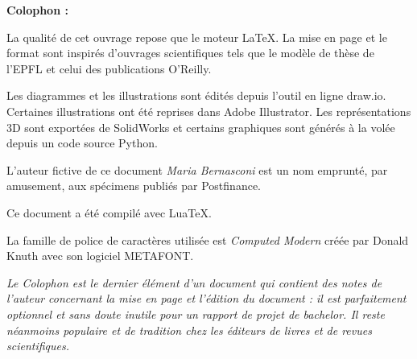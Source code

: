 \clearpage
\Large\textbf{Colophon :}\par\normalsize
\thispagestyle{empty}
La qualité de cet ouvrage repose que le moteur \LaTeX. La mise en page et le format sont inspirés d'ouvrages scientifiques tels que le modèle de thèse de l'EPFL et celui des publications O'Reilly.

Les diagrammes et les illustrations sont édités depuis l'outil en ligne draw.io. Certaines illustrations ont été reprises dans Adobe Illustrator. Les représentations 3D sont exportées de SolidWorks et certains graphiques sont générés à la volée depuis un code source Python.

L'auteur fictive de ce document \emph{Maria Bernasconi} est un nom emprunté, par amusement, aux spécimens publiés par Postfinance.

Ce document a été compilé avec \mbox{Lua\TeX}.

La famille de police de caractères utilisée est \emph{Computed Modern} créée par Donald Knuth avec son logiciel METAFONT.

\vfil

\emph{Le Colophon est le dernier élément d'un document qui contient des notes de l'auteur concernant la mise en page et l'édition du document : il est parfaitement optionnel et sans doute inutile pour un rapport de projet de bachelor. Il reste néanmoins populaire et de tradition chez les éditeurs de livres et de revues scientifiques.}
